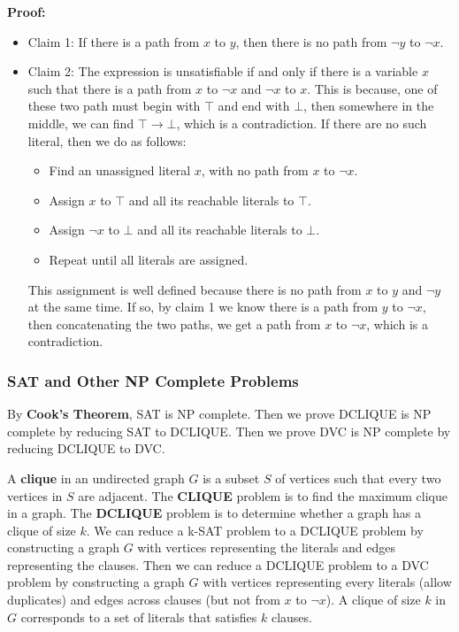 \documentclass[a4paper,12pt]{article}
\begin{document}
\textbf{Proof:}
\begin{itemize}
	\item Claim 1: If there is a path from $x$ to $y$, then there is no path from $\neg y$ to $\neg x$.
	\item Claim 2: The expression is unsatisfiable if and only if there is a variable $x$ such that there is a path from $x$ to $\neg x$ and $\neg x$ to $x$.
		This is because, one of these two path must begin with $\top$ and end with $\bot$, then somewhere in the middle, we can find $\top \rightarrow \bot$, which is a contradiction.
		If there are no such literal, then we do as follows:
		\begin{itemize}
			\item Find an unassigned literal $x$, with no path from $x$ to $\neg x$.
			\item Assign $x$ to $\top$ and all its reachable literals to $\top$.
			\item Assign $\neg x$ to $\bot$ and all its reachable literals to $\bot$.
			\item Repeat until all literals are assigned.
		\end{itemize}
		This assignment is well defined because there is no path from $x$ to $y$ and $\neg y$ at the same time.
		If so, by claim 1 we know there is a path from $y$ to $\neg x$, then concatenating the two paths, we get a path from $x$ to $\neg x$, which is a contradiction.
\end{itemize}

\subsubsection{SAT and Other NP Complete Problems}

By \textbf{Cook's Theorem}, SAT is NP complete.
Then we prove DCLIQUE is NP complete by reducing SAT to DCLIQUE.
Then we prove DVC is NP complete by reducing DCLIQUE to DVC.

A \textbf{clique} in an undirected graph $G$ is a subset $S$ of vertices such that every two vertices in $S$ are adjacent.
The \textbf{CLIQUE} problem is to find the maximum clique in a graph.
The \textbf{DCLIQUE} problem is to determine whether a graph has a clique of size $k$.
We can reduce a k-SAT problem to a DCLIQUE problem by constructing a graph $G$ with vertices representing the literals and edges representing the clauses.
Then we can reduce a DCLIQUE problem to a DVC problem by constructing a graph $G$ with vertices representing every literals (allow duplicates) and edges across clauses (but not from $x$ to $\neg x$).
A clique of size $k$ in $G$ corresponds to a set of literals that satisfies $k$ clauses.
\end{document}

